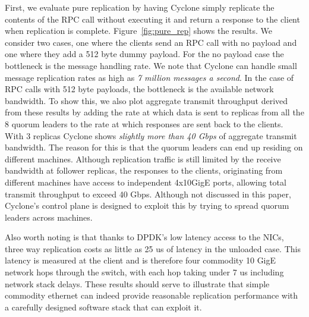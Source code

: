 \documentclass[letterpaper,twocolumn,10pt]{article}
\begin{document}
First, we evaluate pure replication by having Cyclone simply replicate the
contents of the RPC call without executing it and return a response to the
client when replication is complete.  Figure~\ref{fig:pure_rep} shows the
results. We consider two cases, one where the clients send an RPC call with no
payload and one where they add a 512 byte dummy payload. For the no payload case
the bottleneck is the message handling rate. We note that Cyclone can handle
small message replication rates as high as \emph{7 million messages a
  second}. In the case of RPC calls with 512 byte payloads, the bottleneck is
the available network bandwidth. To show this, we also plot aggregate transmit
throughput derived from these results by adding the rate at which data is sent
to replicas from all the 8 quorum leaders to the rate at which responses are
sent back to the clients.  With 3 replicas Cyclone shows \emph{slightly more
  than 40 Gbps} of aggregate transmit bandwidth. The reason for this is that the
quorum leaders can end up residing on different machines. Although replication
traffic is still limited by the receive bandwidth at follower replicas, the
responses to the clients, originating from different machines have access to
independent 4x10GigE ports, allowing total transmit throughput to exceed 40
Gbps. Although not discussed in this paper, Cyclone's control plane is designed
to exploit this by trying to spread quorum leaders across machines.

Also worth noting is that thanks to DPDK's low latency access to the NICs, three
way replication costs as little as 25 us of latency in the unloaded case. This
latency is measured at the client and is therefore four commodity 10 GigE
network hops through the switch, with each hop taking under 7 us including
network stack delays. These results should serve to illustrate that simple
commodity ethernet can indeed provide reasonable replication performance with a
carefully designed software stack that can exploit it.
\end{document}

